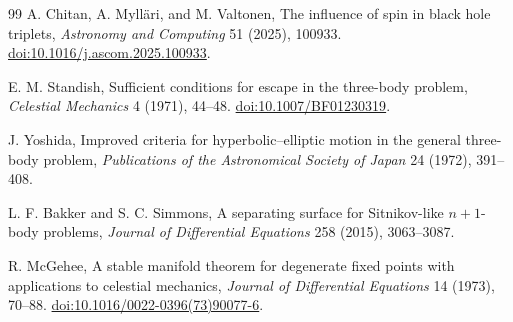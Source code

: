 \begin{thebibliography}{99}
A. Chitan, A. Myll\"ari, and M. Valtonen,
The influence of spin in black hole triplets,
\emph{Astronomy and Computing} 51 (2025), 100933.
\href{https://doi.org/10.1016/j.ascom.2025.100933}{doi:10.1016/j.ascom.2025.100933}.

E. M. Standish, Sufficient conditions for escape in the three-body problem,
\emph{Celestial Mechanics} 4 (1971), 44--48.
\href{https://doi.org/10.1007/BF01230319}{doi:10.1007/BF01230319}.

J. Yoshida, Improved criteria for hyperbolic--elliptic motion in the general
three-body problem, \emph{Publications of the Astronomical Society of Japan}
24 (1972), 391--408.

L. F. Bakker and S. C. Simmons, A separating surface for Sitnikov-like
$n+1$-body problems, \emph{Journal of Differential Equations} 258 (2015),
3063--3087.

R. McGehee, A stable manifold theorem for degenerate fixed points with
applications to celestial mechanics, \emph{Journal of Differential Equations}
14 (1973), 70--88.
\href{https://doi.org/10.1016/0022-0396(73)90077-6}{doi:10.1016/0022-0396(73)90077-6}.
\end{thebibliography}
